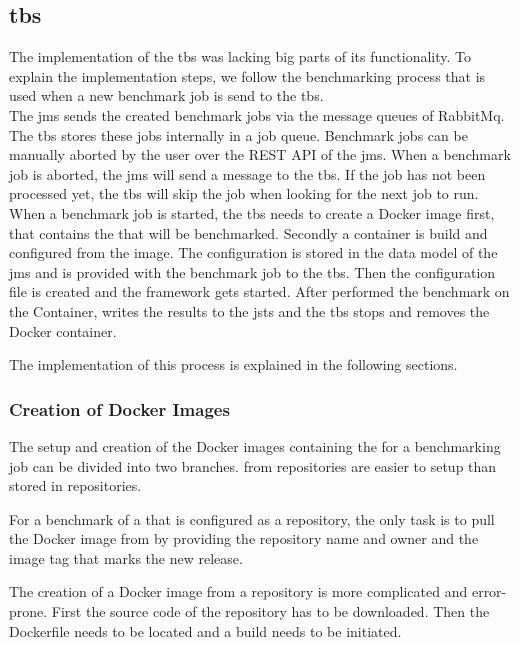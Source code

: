\subsection{\acl{tbs}}
The implementation of the \acl{tbs} was lacking big parts of its functionality.
To explain the implementation steps, we follow the benchmarking process that is used when a new benchmark job is send to the \ac{tbs}.
\\

The \ac{jms} sends the created benchmark jobs via the message queues of RabbitMq.
The \ac{tbs} stores these jobs internally in a job queue.
Benchmark jobs can be manually aborted by the user over the REST API of the \ac{jms}.
When a benchmark job is aborted, the \ac{jms} will send a message to the \ac{tbs}.
If the job has not been processed yet, the \ac{tbs} will skip the job when looking for the next job to run.
\\

When a benchmark job is started, the \ac{tbs} needs to create a Docker image first, that contains the \ts{} that will be benchmarked.
Secondly a container is build and configured from the image.
The configuration is stored in the data model of the \ac{jms} and is provided with the benchmark job to the \ac{tbs}.
Then the \iguana{} configuration file is created and the framework gets started.
After \iguana{} performed the benchmark on the Container, \iguana{} writes the results to the \ac{jsts} and the \ac{tbs} stops and removes the Docker container.

The implementation of this process is explained in the following sections.


\subsubsection{Creation of Docker Images}
The setup and creation of the Docker images containing the \ts{} for a benchmarking job can be divided into two branches.
\tsp{} from \dockh{} repositories are easier to setup than \tsp{} stored in \gh{} repositories.

For a benchmark of a \ts{} that is configured as a \dockh repository, the only task is to pull the Docker image from \dockh{} by providing the repository name and owner and the image tag that marks the new release.

The creation of a Docker image from a \gh{} repository is more complicated and error-prone.
First the source code of the repository has to be downloaded. 
Then the Dockerfile needs to be located and a build needs to be initiated.
\\

